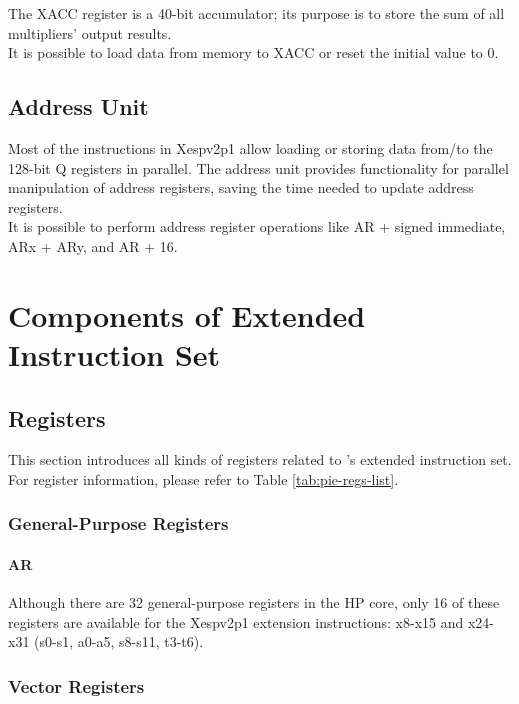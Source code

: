 \documentclass[main\_\_EN.tex]{subfiles}
\begin{document}
The XACC register is a 40-bit accumulator; its purpose is to store the sum of all multipliers' output results.\\
It is possible to load data from memory to XACC or reset the initial value to 0.

\subsection{Address Unit}

Most of the instructions in Xespv2p1 allow loading or storing data from/to the 128-bit Q registers in parallel. The address unit provides functionality for parallel manipulation of address registers, saving the time needed to update address registers.\\
It is possible to perform address register operations like AR + signed immediate, ARx + ARy, and AR + 16.


\section{Components of Extended Instruction Set}

\subsection{Registers}

This section introduces all kinds of registers related to \chipname{}'s extended instruction set. 
For register information, please refer to Table \ref{tab:pie-regs-list}.



\subsubsection{General-Purpose Registers}
\paragraph{AR}


Although there are 32 general-purpose registers in the HP core, only 16 of these registers are available for the Xespv2p1 extension instructions: x8-x15 and x24-x31 (s0-s1, a0-a5, s8-s11, t3-t6).



\subsubsection{Vector Registers}
\end{document}
